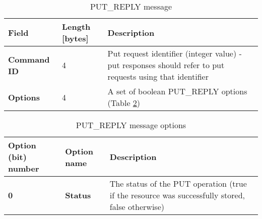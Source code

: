 \begin{table}[H]
\scriptsize
\begin{center}
\begin{tabular}{p{3cm} p{2cm} p{9.5cm}}
	\hline
	\textbf{Field}						& \textbf{Length} [bytes]				& \textbf{Description}				\\[1mm]
    \hline
	\textbf{Command ID}					& 4										& Put request identifier (integer value) - put responses should refer to put requests using that identifier					\\[1.5mm]
    \textbf{Options}					& 4										& A set of boolean PUT\_REPLY options (Table \ref{tab:mPutReplyOptions})					\\[1.5mm]
    \hline
\end{tabular}
\end{center}
\caption{PUT\_REPLY message}
\label{tab:mPutReply}
\end{table}

\begin{table}[H]
\scriptsize
\begin{center}
\begin{tabular}{p{3cm} p{3cm} p{8.5cm}}
	\hline
	\textbf{Option (bit) number}			& \textbf{Option name}					& \textbf{Description}				\\[1mm]
    \hline
	\textbf{0}								& \textbf{Status}						& The status of the PUT operation (true if the resource was successfully stored, false otherwise)						\\[1.5mm]
    \hline
\end{tabular}
\end{center}
\caption{PUT\_REPLY message options}
\label{tab:mPutReplyOptions}
\end{table}





